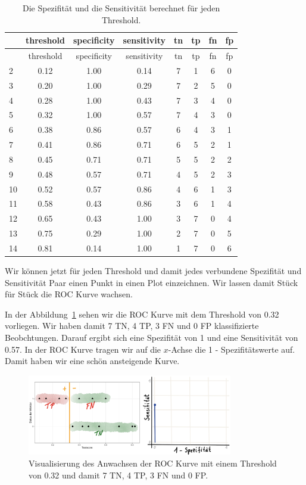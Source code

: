 \documentclass[
  letterpaper,
]{scrbook}
\begin{document}
\hypertarget{tbl-data-roc-2}{}
\begin{longtable}[]{@{}lccccccc@{}}
\caption{\label{tbl-data-roc-2}Die Spezifität und die Sensitivität
berechnet für jeden Threshold.}\tabularnewline
\toprule()
& threshold & specificity & sensitivity & tn & tp & fn & fp \\
\midrule()
\endfirsthead
\toprule()
& threshold & specificity & sensitivity & tn & tp & fn & fp \\
\midrule()
\endhead
2 & 0.12 & 1.00 & 0.14 & 7 & 1 & 6 & 0 \\
3 & 0.20 & 1.00 & 0.29 & 7 & 2 & 5 & 0 \\
4 & 0.28 & 1.00 & 0.43 & 7 & 3 & 4 & 0 \\
5 & 0.32 & 1.00 & 0.57 & 7 & 4 & 3 & 0 \\
6 & 0.38 & 0.86 & 0.57 & 6 & 4 & 3 & 1 \\
7 & 0.41 & 0.86 & 0.71 & 6 & 5 & 2 & 1 \\
8 & 0.45 & 0.71 & 0.71 & 5 & 5 & 2 & 2 \\
9 & 0.48 & 0.57 & 0.71 & 4 & 5 & 2 & 3 \\
10 & 0.52 & 0.57 & 0.86 & 4 & 6 & 1 & 3 \\
11 & 0.58 & 0.43 & 0.86 & 3 & 6 & 1 & 4 \\
12 & 0.65 & 0.43 & 1.00 & 3 & 7 & 0 & 4 \\
13 & 0.75 & 0.29 & 1.00 & 2 & 7 & 0 & 5 \\
14 & 0.81 & 0.14 & 1.00 & 1 & 7 & 0 & 6 \\
\bottomrule()
\end{longtable}

Wir können jetzt für jeden Threshold und damit jedes verbundene
Spezifität und Sensitivität Paar einen Punkt in einen Plot einzeichnen.
Wir lassen damit Stück für Stück die ROC Kurve wachsen.

In der Abbildung~\ref{fig-roc-drawn-1} sehen wir die ROC Kurve mit dem
Threshold von 0.32 vorliegen. Wir haben damit 7 TN, 4 TP, 3 FN und 0 FP
klassifizierte Beobchtungen. Darauf ergibt sich eine Spezifität von 1
und eine Sensitivität von 0.57. In der ROC Kurve tragen wir auf die
\(x\)-Achse die 1 - Spezifitätswerte auf. Damit haben wir eine schön
ansteigende Kurve.

\begin{figure}

{\centering \includegraphics[width=0.8\textwidth,height=\textheight]{./images/diag-roc-01.png}

}

\caption{\label{fig-roc-drawn-1}Visualisierung des Anwachsen der ROC
Kurve mit einem Threshold von 0.32 und damit 7 TN, 4 TP, 3 FN und 0 FP.}

\end{figure}
\end{document}
